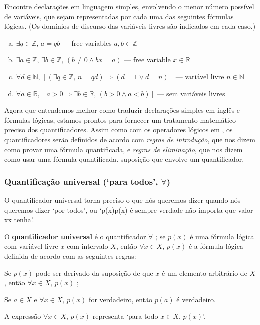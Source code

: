 \begin{exercise}
\label{exLogicalFormulaeToEnglish}
Encontre declarações em linguagem simples, envolvendo o menor número possível de variáveis, que sejam representadas por cada uma das seguintes fórmulas lógicas. (Os domínios de discurso das variáveis ​​livres são indicados em cada caso.)
\begin{enumerate}[(a)]
\item $\exists q \in \mathbb{Z},\, a = qb$ --- free variables $a, b \in \mathbb{Z}$
\item $\exists a \in \mathbb{Z},\, \exists b \in \mathbb{Z},\, (b \ne 0 \wedge bx = a)$ --- free variable $x \in \mathbb{R}$
\item $\forall d \in \mathbb{N},\, [(\exists q \in \mathbb{Z},\, n=qd) \Rightarrow (d = 1 \vee d = n)]$ --- variável livre $n \in \mathbb{N}$
\item $\forall a \in \mathbb{R},\, [a > 0 \Rightarrow \exists b \in \mathbb{R},\, (b > 0 \wedge a < b)]$ --- sem variáveis ​​livres
\end{enumerate}
\end{exercise}

Agora que entendemos melhor como traduzir declarações simples em inglês e fórmulas lógicas, estamos prontos para fornecer um tratamento matemático preciso dos quantificadores. Assim como com os operadores lógicos em , os quantificadores serão definidos de acordo com \textit{regras de introdução}, que nos dizem como provar uma fórmula quantificada, e \textit{regras de eliminação}, que nos dizem como usar uma fórmula quantificada. suposição que envolve um quantificador.

\subsubsection*{Quantificação universal (`para todos', $\forall$)}

O quantificador universal torna preciso o que nós queremos dizer quando nós queremos dizer `por todos', ou `p(x)p(x) é sempre verdade não importa que valor xx tenha'.

\begin{definition}
\label{defUniversalQuantifier}
O \textbf{quantificador universal} é o quantificador $\forall$ ; se $p(x)$ é uma fórmula lógica com variável livre $x$ com intervalo $X$, então $\forall x \in X,\, p(x)$ é a fórmula lógica definida de acordo com as seguintes regras:
\begin{itemizar}
\item \introrule{\forall} Se $p(x)$ pode ser derivado da suposição de que $x$ é um elemento arbitrário de $X$, então $\forall x \in X,\, p(x)$ ;
\item \elimrule{\forall} Se $a \in X$ e $\forall x \in X,\, p(x)$ for verdadeiro, então $p(a)$ é verdadeiro.
\end{itemizar}
A expressão $\forall x \in X,\, p(x)$ representa `para todo $x \in X$, $p(x)$'.
\end{definition}


